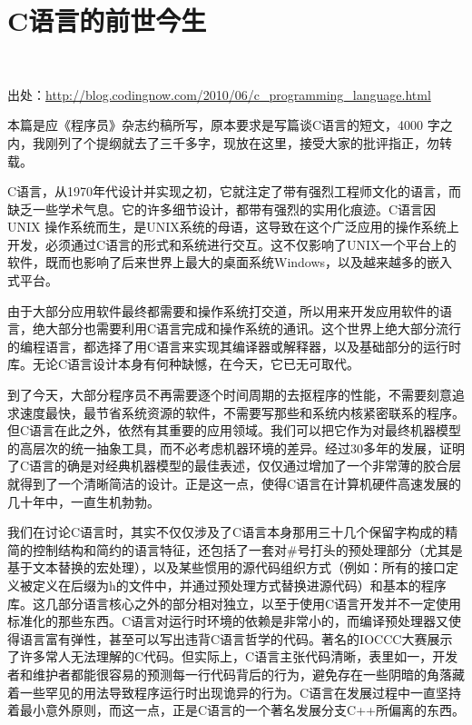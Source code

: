 \chapter{C语言的前世今生}


{\noindent\heiti{}}\\
{}

\vspace{10pt}

出处：\url{http://blog.codingnow.com/2010/06/c\_programming\_language.html}


本篇是应《程序员》杂志约稿所写，原本要求是写篇谈C语言的短文，4000 字之内，我刚列了个提纲就去了三千多字，现放在这里，接受大家的批评指正，勿转载。

\vspace{20pt}

C语言，从1970年代设计并实现之初，它就注定了带有强烈工程师文化的语言，而缺乏一些学术气息。它的许多细节设计，都带有强烈的实用化痕迹。C语言因UNIX 操作系统而生，是UNIX系统的母语，这导致在这个广泛应用的操作系统上开发，必须通过C语言的形式和系统进行交互。这不仅影响了UNIX一个平台上的软件，既而也影响了后来世界上最大的桌面系统Windows，以及越来越多的嵌入式平台。

由于大部分应用软件最终都需要和操作系统打交道，所以用来开发应用软件的语言，绝大部分也需要利用C语言完成和操作系统的通讯。这个世界上绝大部分流行的编程语言，都选择了用C语言来实现其编译器或解释器，以及基础部分的运行时库。无论C语言设计本身有何种缺憾，在今天，它已无可取代。

到了今天，大部分程序员不再需要逐个时间周期的去抠程序的性能，不需要刻意追求速度最快，最节省系统资源的软件，不需要写那些和系统内核紧密联系的程序。但C语言在此之外，依然有其重要的应用领域。我们可以把它作为对最终机器模型的高层次的统一抽象工具，而不必考虑机器环境的差异。经过30多年的发展，证明了C语言的确是对经典机器模型的最佳表述，仅仅通过增加了一个非常薄的胶合层就得到了一个清晰简洁的设计。正是这一点，使得C语言在计算机硬件高速发展的几十年中，一直生机勃勃。

我们在讨论C语言时，其实不仅仅涉及了C语言本身那用三十几个保留字构成的精简的控制结构和简约的语言特征，还包括了一套对\#号打头的预处理部分（尤其是基于文本替换的宏处理），以及某些惯用的源代码组织方式（例如：所有的接口定义被定义在后缀为h的文件中，并通过预处理方式替换进源代码）和基本的程序库。这几部分语言核心之外的部分相对独立，以至于使用C语言开发并不一定使用标准化的那些东西。C语言对运行时环境的依赖是非常小的，而编译预处理器又使得语言富有弹性，甚至可以写出违背C语言哲学的代码。著名的IOCCC大赛展示了许多常人无法理解的C代码。但实际上，C语言主张代码清晰，表里如一，开发者和维护者都能很容易的预测每一行代码背后的行为，避免存在一些阴暗的角落藏着一些罕见的用法导致程序运行时出现诡异的行为。C语言在发展过程中一直坚持着最小意外原则，而这一点，正是C语言的一个著名发展分支C++所偏离的东西。

